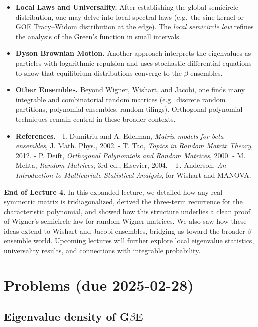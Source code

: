 \documentclass[letterpaper,11pt,oneside,reqno]{article}
\numberwithin{equation}{section}
\theoremstyle{definition}
\begin{document}
\begin{itemize}
\item {\bf Local Laws and Universality.} After establishing the global semicircle distribution, one may delve into local spectral laws (e.g.\ the sine kernel or GOE Tracy–Widom distribution at the edge). The \emph{local semicircle law} refines the analysis of the Green’s function in small intervals.
\item {\bf Dyson Brownian Motion.} Another approach interprets the eigenvalues as particles with logarithmic repulsion and uses stochastic differential equations to show that equilibrium distributions converge to the $\beta$-ensembles.
\item {\bf Other Ensembles.} Beyond Wigner, Wishart, and Jacobi, one finds many integrable and combinatorial random matrices (e.g.\ discrete random partitions, polynomial ensembles, random tilings). Orthogonal polynomial techniques remain central in these broader contexts.
\item {\bf References.}
  - I. Dumitriu and A. Edelman, \emph{Matrix models for beta ensembles}, J. Math. Phys., 2002.
  - T. Tao, \emph{Topics in Random Matrix Theory}, 2012.
  - P. Deift, \emph{Orthogonal Polynomials and Random Matrices}, 2000.
  - M. Mehta, \emph{Random Matrices}, 3rd ed., Elsevier, 2004.
  - T. Anderson, \emph{An Introduction to Multivariate Statistical Analysis}, for Wishart and MANOVA.
\end{itemize}


\bigskip
\noindent
\textbf{End of Lecture 4.} In this expanded lecture, we detailed how any real symmetric matrix is tridiagonalized, derived the three-term recurrence for the characteristic polynomial, and showed how this structure underlies a clean proof of Wigner’s semicircle law for random Wigner matrices. We also saw how these ideas extend to Wishart and Jacobi ensembles, bridging us toward the broader \(\beta\)-ensemble world. Upcoming lectures will further explore local eigenvalue statistics, universality results, and connections with integrable probability.





\appendix
\setcounter{section}{3}

\section{Problems (due 2025-02-28)}

\subsection{Eigenvalue density of G$\beta$E}
\end{document}
